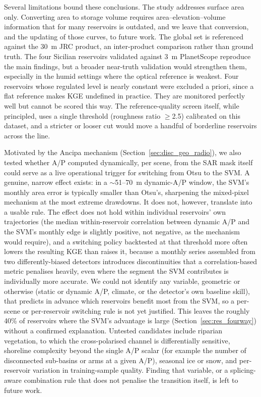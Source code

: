 Several limitations bound these conclusions. The study addresses surface area
only. Converting area to storage volume requires area--elevation--volume
information that for many reservoirs is outdated, and we leave that conversion,
and the updating of those curves, to future work. The global set is referenced
against the 30~m JRC product, an inter-product comparison rather than ground
truth. The four Sicilian reservoirs validated against 3~m PlanetScope reproduce
the main findings, but a broader near-truth validation would strengthen them,
especially in the humid settings where the optical reference is weakest. Four
reservoirs whose regulated level is nearly constant were excluded a priori,
since a flat reference makes KGE undefined in practice. They are monitored
perfectly well but cannot be scored this way. The reference-quality screen
itself, while principled, uses a single threshold (roughness ratio
$\geq$2.5) calibrated on this dataset, and a stricter or looser cut would move a
handful of borderline reservoirs across the line.

Motivated by the Ancipa mechanism (Section~\ref{sec:disc_geo_radio}), we also
tested whether A/P computed dynamically, per scene, from the SAR mask itself
could serve as a live operational trigger for switching from Otsu to the SVM.
A genuine, narrow effect exists: in a $\sim$51--70~m dynamic-A/P window, the
SVM's monthly area error is typically smaller than Otsu's, sharpening the
mixed-pixel mechanism at the most extreme drawdowns. It does not, however,
translate into a usable rule. The effect does not hold within individual
reservoirs' own trajectories (the median within-reservoir correlation between
dynamic A/P and the SVM's monthly edge is slightly positive, not negative, as
the mechanism would require), and a switching policy backtested at that
threshold more often lowers the resulting KGE than raises it, because a
monthly series assembled from two differently-biased detectors introduces
discontinuities that a correlation-based metric penalises heavily, even where
the segment the SVM contributes is individually more accurate. We could not
identify any variable, geometric or otherwise (static or dynamic A/P, climate,
or the detector's own baseline skill), that predicts in advance which
reservoirs benefit most from the SVM, so a per-scene or per-reservoir
switching rule is not yet justified. This leaves the roughly 40\% of
reservoirs where the SVM's advantage is large (Section~\ref{sec:res_fourway})
without a confirmed explanation. Untested candidates include riparian
vegetation, to which the cross-polarised channel is differentially sensitive,
shoreline complexity beyond the single A/P scalar (for example the number of
disconnected sub-basins or arms at a given A/P), seasonal ice or snow, and
per-reservoir variation in training-sample quality. Finding that variable, or
a splicing-aware combination rule that does not penalise the transition
itself, is left to future work.

